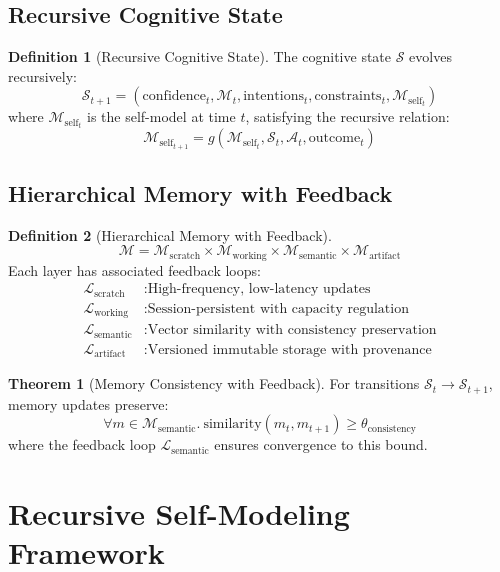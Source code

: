 \documentclass[12pt]{article}
\theoremstyle{definition}
\newtheorem{definition}{Definition}[section]
\newtheorem{theorem}{Theorem}[section]
\newcommand{\state}{\mathcal{S}}
\newcommand{\action}{\mathcal{A}}
\newcommand{\memory}{\mathcal{M}}
\newcommand{\self}{\mathcal{M}_{\text{self}}}
\newcommand{\feedback}{\mathcal{L}}
\begin{document}
\subsection{Recursive Cognitive State}

\begin{definition}[Recursive Cognitive State]
The cognitive state $\state$ evolves recursively:
\[
\state_{t+1} = (\text{confidence}_t, \memory_t, \text{intentions}_t, \text{constraints}_t, \self_t)
\]
where $\self_t$ is the self-model at time $t$, satisfying the recursive relation:
\[
\self_{t+1} = g(\self_t, \state_t, \action_t, \text{outcome}_t)
\]
\end{definition}

\subsection{Hierarchical Memory with Feedback}

\begin{definition}[Hierarchical Memory with Feedback]
\[
\memory = \memory_{\text{scratch}} \times \memory_{\text{working}} \times \memory_{\text{semantic}} \times \memory_{\text{artifact}}
\]
Each layer has associated feedback loops:
\begin{align*}
    \feedback_{\text{scratch}} &: \text{High-frequency, low-latency updates} \\
    \feedback_{\text{working}} &: \text{Session-persistent with capacity regulation} \\
    \feedback_{\text{semantic}} &: \text{Vector similarity with consistency preservation} \\
    \feedback_{\text{artifact}} &: \text{Versioned immutable storage with provenance}
\end{align*}
\end{definition}

\begin{theorem}[Memory Consistency with Feedback]
For transitions $\state_t \to \state_{t+1}$, memory updates preserve:
\[
\forall m \in \memory_{\text{semantic}}.\ \text{similarity}(m_t, m_{t+1}) \geq \theta_{\text{consistency}}
\]
where the feedback loop $\feedback_{\text{semantic}}$ ensures convergence to this bound.
\end{theorem}

\section{Recursive Self-Modeling Framework}
\end{document}
